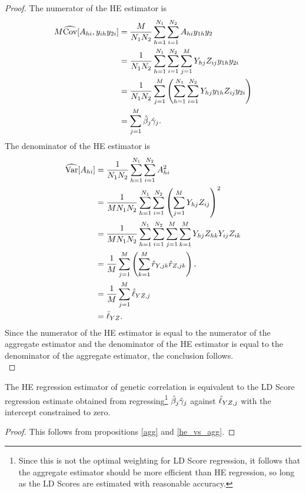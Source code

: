 \documentclass[11pt]{article}
\numberwithin{equation}{section}
\numberwithin{definition}{section}
\numberwithin{thm}{section}
\numberwithin{lemma}{section}
\numberwithin{prop}{section}
\numberwithin{cor}{section}
\numberwithin{hyp}{section}
\begin{document}
\begin{proof} The numerator of the HE estimator is 
\begin{align*}
	M\widehat{\mathrm{Cov}}[A_{hi}, y_{ih}y_{2i}] 
&= 
	\frac{M}{N_1N_2}
		\sum_{h=1}^{N_1} 
			\sum_{i=1}^{N_2} 
				A_{hi}y_{1h}y_{2}	\\
&= 
	\frac{1}{N_1N_2} 
		\sum_{h = 1}^{N_1} 
			\sum_{i = 1}^{N_2} 
				\sum_{j = 1}^M 
					Y_{hj}Z_{ij}y_{1h}y_{2i}	 \\
&= 
	\frac{1}{N_1N_2}\sum_{j = 1}^M \left( 
		\sum_{h = 1}^{N_1} 
			\sum_{i = 1}^{N_2} Y_{hj}
				y_{1h} Z_{ij}y_{2i} 
	\right) \\
&= 
	\sum_{j = 1}^M \hat{\beta}_j\hat{\gamma}_j.
\end{align*}	
The denominator of the HE estimator is 
\begin{align*}
	\widehat{\mathrm{Var}}[A_{hi}]
&= 
	\frac{1}{N_1N_2} 
		\sum_{h = 1}^{N_1}
			\sum_{i = 1}^{N_2} 
				A_{hi}^2\\
&= 
	\frac{1}{MN_1N_2} 
		\sum_{h = 1}^{N_1} 
			\sum_{i = 1}^{N_2} \left( 
				\sum_{j = 1}^M 
					Y_{hj}Z_{ij} 
			\right)^2\\
&= 
	\frac{1}{MN_1N_2} 
		\sum_{h = 1}^{N_1}	
			\sum_{i = 1}^{N_2}
				\sum_{j = 1}^M 
					\sum_{k=1}^M 
						Y_{hj}Z_{hk}Y_{ij}Z_{ik} \\	
&= 
	\frac{1}{M} 
		\sum_{j = 1}^M \left( 
			\sum_{k=1}^M \hat{r}_{Y,jk}\hat{r}_{Z,jk} 
		\right),\\
&= 
	\frac{1}{M} 
		\sum_{j=1}^M 
			\hat{\ell}_{YZ,j} \\
&= 
	\bar{\ell}_{YZ}.
\end{align*}
Since the numerator of the HE estimator is equal to the numerator of the aggregate estimator 
and the denominator of the HE estimator is equal to the denominator of the aggregate estimator,
the conclusion follows.  \\
\end{proof}
\begin{cor} The HE regression estimator of genetic correlation is equivalent to the LD Score regression estimate obtained 
from regressing\footnote{
Since this is not the optimal weighting for LD Score regression, 
it follows that the aggregate estimator should be more efficient than HE regression,
so long as the LD Scores are estimated with reasonable accuracy.}
$\hat{\beta}_j\hat{\gamma}_j$ against $\hat{\ell}_{YZ,j}$ with the intercept constrained to zero.
\end{cor}
\begin{proof}
This follows from propositions \ref{agg} and  \ref{he_vs_agg}.
\end{proof}
\end{document}
